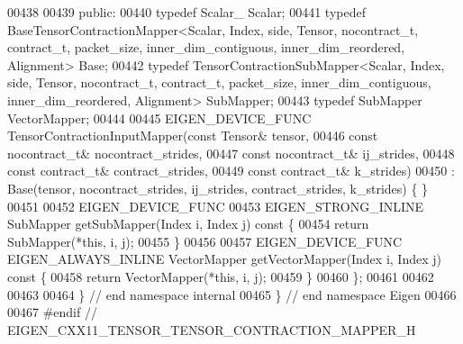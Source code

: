 \begin{DoxyCode}
00438 
00439  \textcolor{keyword}{public}:
00440   \textcolor{keyword}{typedef} Scalar\_ Scalar;
00441   \textcolor{keyword}{typedef} BaseTensorContractionMapper<Scalar, Index, side, Tensor, nocontract\_t, contract\_t, packet\_size,
       inner\_dim\_contiguous, inner\_dim\_reordered, Alignment> Base;
00442   \textcolor{keyword}{typedef} TensorContractionSubMapper<Scalar, Index, side, Tensor, nocontract\_t, contract\_t, packet\_size,
       inner\_dim\_contiguous, inner\_dim\_reordered, Alignment> SubMapper;
00443   \textcolor{keyword}{typedef} SubMapper VectorMapper;
00444 
00445   EIGEN\_DEVICE\_FUNC TensorContractionInputMapper(\textcolor{keyword}{const} Tensor& tensor,
00446                                \textcolor{keyword}{const} nocontract\_t& nocontract\_strides,
00447                                \textcolor{keyword}{const} nocontract\_t& ij\_strides,
00448                                \textcolor{keyword}{const} contract\_t& contract\_strides,
00449                                \textcolor{keyword}{const} contract\_t& k\_strides)
00450       : Base(tensor, nocontract\_strides, ij\_strides, contract\_strides, k\_strides) \{ \}
00451 
00452   EIGEN\_DEVICE\_FUNC
00453   EIGEN\_STRONG\_INLINE SubMapper getSubMapper(Index i, Index j)\textcolor{keyword}{ const }\{
00454     \textcolor{keywordflow}{return} SubMapper(*\textcolor{keyword}{this}, i, j);
00455   \}
00456 
00457   EIGEN\_DEVICE\_FUNC EIGEN\_ALWAYS\_INLINE VectorMapper getVectorMapper(Index i, Index j)\textcolor{keyword}{ const }\{
00458     \textcolor{keywordflow}{return} VectorMapper(*\textcolor{keyword}{this}, i, j);
00459   \}
00460 \};
00461 
00462 
00463 
00464 \}  \textcolor{comment}{// end namespace internal}
00465 \}  \textcolor{comment}{// end namespace Eigen}
00466 
00467 \textcolor{preprocessor}{#endif // EIGEN\_CXX11\_TENSOR\_TENSOR\_CONTRACTION\_MAPPER\_H}
\end{DoxyCode}
